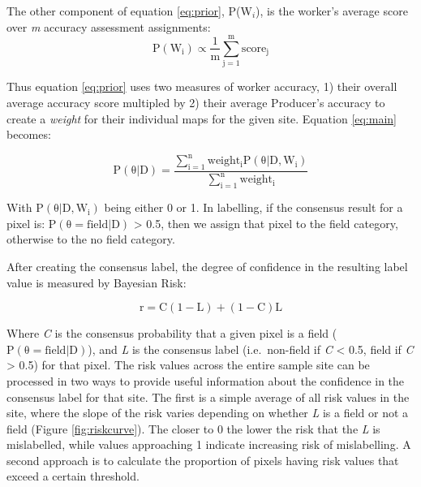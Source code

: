 \documentclass[
  11pt,
  a4paper]{article}
\begin{document}
The other component of equation \ref{eq:prior}, P(W\(_i\)), is the
worker's average score over \emph{m} accuracy assessment assignments:\\
\begin{equation} 
\mathrm{P(W_i) \propto \frac{1}{m}\sum_{j=1}^{m}score_j}
\end{equation}

Thus equation \ref{eq:prior} uses two measures of worker accuracy, 1)
their overall average accuracy score multipled by 2) their average
Producer's accuracy to create a \emph{weight} for their individual maps
for the given site. Equation \ref{eq:main} becomes:

\begin{equation} 
\mathrm{P(\theta|D)=\frac{\sum_{i=1}^{n}weight_iP(\theta|D, W_i)}{\sum_{i=1}^{n}weight_i}}
\end{equation}

With \(\mathrm{P(\theta|D, W_i)}\) being either 0 or 1. In labelling, if
the consensus result for a pixel is: \(\mathrm{P(\theta = field|D)}\)
\textgreater{} 0.5, then we assign that pixel to the field category,
otherwise to the no field category.

After creating the consensus label, the degree of confidence in the
resulting label value is measured by Bayesian Risk:

\begin{equation} \label{eq:pixelrisk}
\mathrm{r=C(1 - L) + (1 - C)L}
\end{equation}

Where \emph{C} is the consensus probability that a given pixel is a
field (\(\mathrm{P(\theta = field|D)}\)), and \emph{L} is the consensus
label (i.e.~non-field if \emph{C} \textless{} 0.5, field if \emph{C}
\textgreater{} 0.5) for that pixel. The risk values across the entire
sample site can be processed in two ways to provide useful information
about the confidence in the consensus label for that site. The first is
a simple average of all risk values in the site, where the slope of the
risk varies depending on whether \emph{L} is a field or not a field
(Figure \ref{fig:riskcurve}). The closer to 0 the lower the risk that
the \emph{L} is mislabelled, while values approaching 1 indicate
increasing risk of mislabelling. A second approach is to calculate the
proportion of pixels having risk values that exceed a certain threshold.
\end{document}
